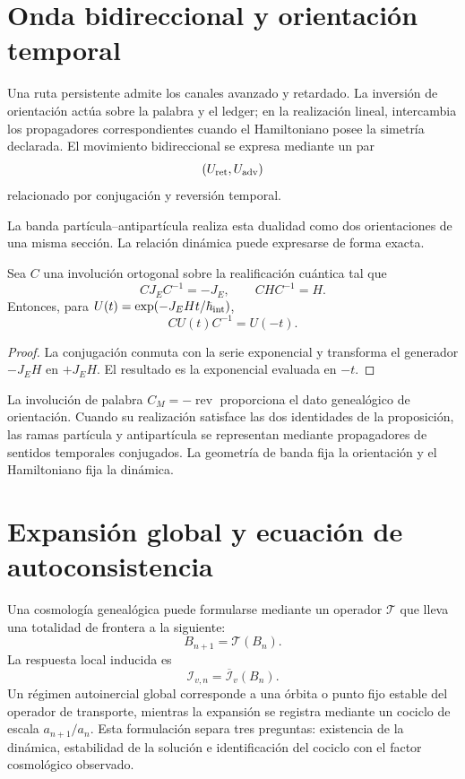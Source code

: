\section{Onda bidireccional y orientación temporal}

Una ruta persistente admite los canales avanzado y retardado. La inversión
de orientación actúa sobre la palabra y el ledger; en la realización lineal,
intercambia los propagadores correspondientes cuando el Hamiltoniano posee la
simetría declarada. El movimiento bidireccional se expresa mediante un par
\[
 (U_{\rm ret},U_{\rm adv})
\]
relacionado por conjugación y reversión temporal.

La banda partícula--antipartícula realiza esta dualidad como dos orientaciones
de una misma sección. La relación dinámica puede expresarse de forma exacta.

\begin{proposition}
Sea \(C\) una involución ortogonal sobre la realificación cuántica tal que
\[
 C J_E C^{-1}=-J_E,
 \qquad
 C H C^{-1}=H.
\]
Entonces, para
\(U(t)=\exp(-J_EHt/\hbar_{\rm int})\),
\[
 C U(t)C^{-1}=U(-t).
\]
\end{proposition}

\begin{proof}
La conjugación conmuta con la serie exponencial y transforma el generador
\(-J_EH\) en \(+J_EH\). El resultado es la exponencial evaluada en
\(-t\).
\end{proof}

La involución de palabra \(C_M=-\operatorname{rev}\) proporciona el dato
genealógico de orientación. Cuando su realización satisface las dos
identidades de la proposición, las ramas partícula y antipartícula se
representan mediante propagadores de sentidos temporales conjugados. La
geometría de banda fija la orientación y el Hamiltoniano fija la dinámica.

\section{Expansión global y ecuación de autoconsistencia}

Una cosmología genealógica puede formularse mediante un operador
\(\mathcal T\) que lleva una totalidad de frontera a la siguiente:
\[
 B_{n+1}=\mathcal T(B_n).
\]
La respuesta local inducida es
\[
 \mathcal I_{v,n}=\overline{\mathcal I}_v(B_n).
\]
Un régimen autoinercial global corresponde a una órbita o punto fijo estable
del operador de transporte, mientras la expansión se registra mediante un
cociclo de escala \(a_{n+1}/a_n\). Esta formulación separa tres preguntas:
existencia de la dinámica, estabilidad de la solución e identificación del
cociclo con el factor cosmológico observado.

